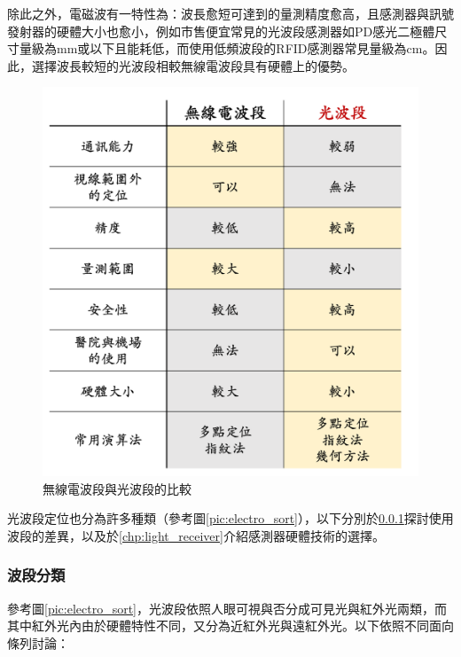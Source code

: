             除此之外，電磁波有一特性為：波長愈短可達到的量測精度愈高，且感測器與訊號發射器的硬體大小也愈小，例如市售便宜常見的光波段感測器如PD感光二極體尺寸量級為mm或以下\cite{datasheet:led_sfh4545}且能耗低，而使用低頻波段的RFID感測器常見量級為cm\cite{datasheet:rfid_tag}。因此，選擇波長較短的光波段相較無線電波段具有硬體上的優勢。

            \begin{figure}[ht]
                \centering
                \includegraphics[width=12cm]{ch2pic/method_compare.png}
                \caption{無線電波段與光波段的比較}
                \label{pic:method_compare}
            \end{figure}


            光波段定位也分為許多種類（參考圖\ref{pic:electro_sort}），以下分別於\ref{chp:light_electro}探討使用波段的差異，以及於\ref{chp:light_receiver}介紹感測器硬體技術的選擇。


            \subsubsection{波段分類}

            \label{chp:light_electro}

            參考圖\ref{pic:electro_sort}，光波段依照人眼可視與否分成可見光與紅外光兩類，而其中紅外光內由於硬體特性不同，又分為近紅外光與遠紅外光。以下依照不同面向條列討論：

